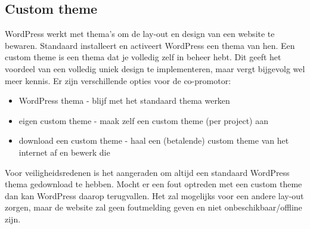 \subsection{Custom theme}
WordPress werkt met thema's om de lay-out en design van een website te bewaren. Standaard installeert en activeert WordPress een thema van hen. Een custom theme is een thema dat je volledig zelf in beheer hebt. Dit geeft het voordeel van een volledig uniek design te implementeren, maar vergt bijgevolg wel meer kennis. Er zijn verschillende opties voor de co-promotor:
\begin{itemize}
    \item WordPress thema - blijf met het standaard thema werken
    \item eigen custom theme - maak zelf een custom theme (per project) aan
    \item download een custom theme - haal een (betalende) custom theme van het internet af en bewerk die
\end{itemize}
Voor veiligheidsredenen is het aangeraden om altijd een standaard WordPress thema gedownload te hebben. Mocht er een fout optreden met een custom theme dan kan WordPress daarop terugvallen. Het zal mogelijks voor een andere lay-out zorgen, maar de website zal geen foutmelding geven en niet onbeschikbaar/offline zijn. 

